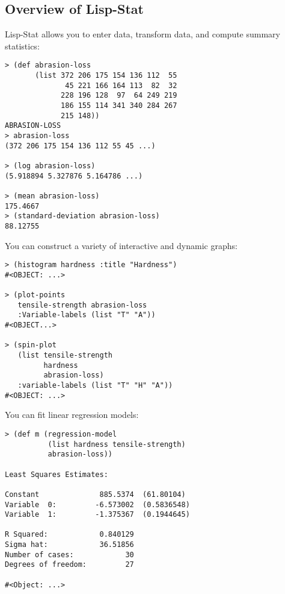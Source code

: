 \begin{slide}{}
\chapter{Overview of Lisp-Stat}
Lisp-Stat allows you to enter data, transform data, and compute
summary statistics:
{\Large
\begin{verbatim}
> (def abrasion-loss 
       (list 372 206 175 154 136 112  55  
              45 221 166 164 113  82  32
             228 196 128  97  64 249 219
             186 155 114 341 340 284 267
             215 148))
ABRASION-LOSS
> abrasion-loss
(372 206 175 154 136 112 55 45 ...)

> (log abrasion-loss)
(5.918894 5.327876 5.164786 ...)

> (mean abrasion-loss)
175.4667
> (standard-deviation abrasion-loss)
88.12755
\end{verbatim}}
\end{slide}

\begin{slide}{}
You can construct a variety of interactive and dynamic graphs:
{\Large
\begin{verbatim}
> (histogram hardness :title "Hardness")
#<OBJECT: ...>

> (plot-points
   tensile-strength abrasion-loss
   :Variable-labels (list "T" "A"))
#<OBJECT...>

> (spin-plot 
   (list tensile-strength
         hardness
         abrasion-loss)
   :variable-labels (list "T" "H" "A"))
#<OBJECT: ...>
\end{verbatim}}
\end{slide}

\begin{slide}{}
You can fit linear regression models:
{\Large
\begin{verbatim}
> (def m (regression-model 
          (list hardness tensile-strength)
          abrasion-loss))

Least Squares Estimates:

Constant              885.5374  (61.80104)
Variable  0:         -6.573002  (0.5836548)
Variable  1:         -1.375367  (0.1944645)

R Squared:            0.840129
Sigma hat:            36.51856
Number of cases:            30
Degrees of freedom:         27

#<Object: ...>
\end{verbatim}}
\end{slide}

